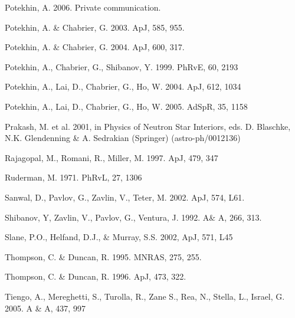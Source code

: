 \documentclass[useAMS,onecolumn,usenatbib,usegraphicx]{mn2e}
\begin{document}
\begin{thebibliography}{}
Potekhin, A. 2006. Private communication.

Potekhin, A. \& Chabrier, G. 2003. ApJ, 585, 955.

Potekhin, A. \& Chabrier, G. 2004. ApJ, 600, 317.

Potekhin, A., Chabrier, G., Shibanov, Y. 1999. PhRvE, 60, 2193

Potekhin, A., Lai, D., Chabrier, G., Ho, W. 2004. ApJ, 612, 1034

Potekhin, A., Lai, D., Chabrier, G., Ho, W. 2005. AdSpR, 35, 1158

Prakash, M. et al. 2001, in Physics of Neutron Star Interiors,
eds. D. Blaschke, N.K. Glendenning \& A. Sedrakian (Springer)
(astro-ph/0012136)

Rajagopal, M., Romani, R., Miller, M. 1997. ApJ, 479, 347

Ruderman, M. 1971. PhRvL, 27, 1306

Sanwal, D., Pavlov, G., Zavlin, V., Teter, M. 2002. ApJ, 574, L61.

Shibanov, Y, Zavlin, V., Pavlov, G., Ventura, J. 1992. A\& A, 266, 313.

Slane, P.O., Helfand, D.J., \& Murray, S.S. 2002, ApJ, 571, L45

Thompson, C. \& Duncan, R. 1995. MNRAS, 275, 255.

Thompson, C. \& Duncan, R. 1996. ApJ, 473, 322.

Tiengo, A., Mereghetti, S., Turolla, R., Zane S., Rea, N., Stella, L., Israel, G. 2005. A \& A, 437, 997


\end{thebibliography}
\end{document}
